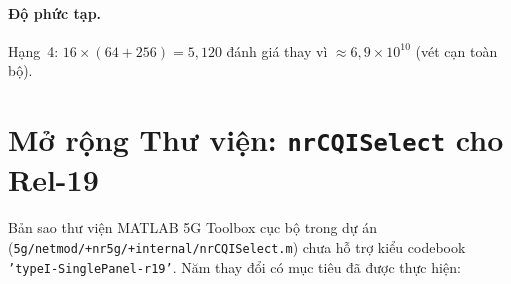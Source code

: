 \documentclass[11pt,a4paper]{article}
\begin{document}
\paragraph{Độ phức tạp.}
Hạng~4: $16\times(64+256)=5{,}120$ đánh giá thay vì
$\approx 6{,}9\times10^{10}$ (vét cạn toàn bộ).

\FloatBarrier
\section{Mở rộng Thư viện: \texttt{nrCQISelect} cho Rel-19}

Bản sao thư viện MATLAB 5G Toolbox cục bộ trong dự án
(\texttt{5g/netmod/+nr5g/+internal/nrCQISelect.m}) chưa hỗ trợ kiểu codebook
\texttt{'typeI-SinglePanel-r19'}. Năm thay đổi có mục tiêu đã được thực hiện:
\end{document}
